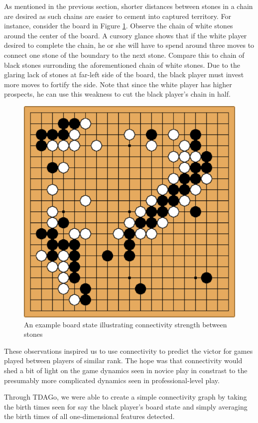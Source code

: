 \documentclass[12pt]{article}
\begin{document}
As mentioned in the previous section, shorter distances between stones in a chain are desired as such chains are easier to cement into captured territory. For instance, consider the board in Figure \ref{fig:conn1}. Observe the chain of white stones around the center of the board. A cursory glance shows that if the white player desired to complete the chain, he or she will have to spend around three moves to connect one stone of the boundary to the next stone. Compare this to chain of black stones surronding the aforementioned chain of white stones. Due to the glaring lack of stones at far-left side of the board, the black player must invest more moves to fortify the side. Note that since the white player has higher prospects, he can use this weakness to cut the black player's chain in half.
\begin{figure}[ht]
  \centering
  \includegraphics{conn1.png}
  \caption{An example board state illustrating connectivity strength between stones}
  \label{fig:conn1}
\end{figure}

These observations inspired us to use connectivity to predict the victor for games played between players of similar rank. The hope was that connectivity would shed a bit of light on the game dynamics seen in novice play in constrast to the presumably more complicated dynamics seen in professional-level play.

Through TDAGo, we were able to create a simple connectivity graph by taking the birth times seen for say the black player's board state and simply averaging the birth times of all one-dimensional features detected. 







\end{document}
